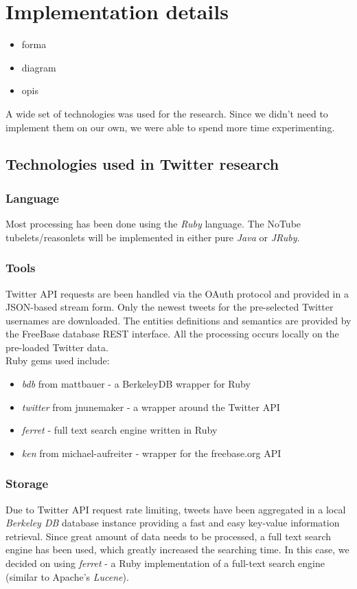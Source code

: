 \section{Implementation details}

\begin{itemize}
  \item {forma}
  \item {diagram}
  \item {opis}
\end{itemize}

A wide set of technologies was used for the research. Since we didn't need to implement them on our own, we were able to spend more time experimenting.

\subsection{Technologies used in Twitter research}
\subsubsection{Language}
Most processing has been done using the \textit{Ruby} language. The NoTube tubelets/reasonlets will be implemented in either pure \textit{Java} or \textit{JRuby}.
\subsubsection{Tools}
Twitter API requests are been handled via the OAuth protocol and provided in a
JSON-based stream form. Only the newest tweets for the pre-selected Twitter
usernames are downloaded. The entities definitions and semantics are provided by
the FreeBase database REST interface. All the processing occurs locally on the
pre-loaded Twitter data. \\ Ruby gems used include: \begin{itemize} \item
\textit{bdb} from mattbauer - a BerkeleyDB wrapper for Ruby
  \item \textit{twitter} from jnunemaker - a wrapper around the Twitter API
  \item \textit{ferret} - full text search engine written in Ruby
  \item \textit{ken} from michael-aufreiter - wrapper for the freebase.org API
\end{itemize}
\subsubsection{Storage}
Due to Twitter API request rate limiting, tweets have been aggregated in a local
\textit{Berkeley DB} database instance providing a fast and easy key-value
information retrieval. Since great amount of data needs to be processed, a full
text search engine has been used, which greatly increased the searching time. In
this case, we decided on using \textit{ferret} - a Ruby implementation of a
full-text search engine (similar to Apache's \textit{Lucene}).

